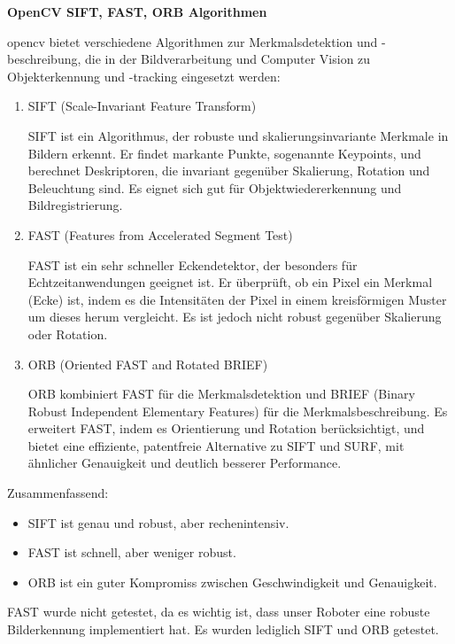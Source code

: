 \textbf{OpenCV SIFT, FAST, ORB Algorithmen}

\gls{opencv} bietet verschiedene Algorithmen zur Merkmalsdetektion und -beschreibung, die in der Bildverarbeitung und Computer Vision zu Objekterkennung und -tracking eingesetzt werden:

\begin{enumerate}
    \item SIFT (Scale-Invariant Feature Transform)
    
    SIFT ist ein Algorithmus, der robuste und skalierungsinvariante Merkmale in Bildern erkennt. Er findet markante Punkte, sogenannte Keypoints, und berechnet Deskriptoren, die invariant gegenüber Skalierung, Rotation und Beleuchtung sind. Es eignet sich gut für Objektwiedererkennung und Bildregistrierung.

    \item FAST (Features from Accelerated Segment Test)
    
    FAST ist ein sehr schneller Eckendetektor, der besonders für Echtzeitanwendungen geeignet ist. Er überprüft, ob ein Pixel ein Merkmal (Ecke) ist, indem es die Intensitäten der Pixel in einem kreisförmigen Muster um dieses herum vergleicht. Es ist jedoch nicht robust gegenüber Skalierung oder Rotation.

    \item ORB (Oriented FAST and Rotated BRIEF)
    
    ORB kombiniert FAST für die Merkmalsdetektion und BRIEF (Binary Robust Independent Elementary Features) für die Merkmalsbeschreibung. Es erweitert FAST, indem es Orientierung und Rotation berücksichtigt, und bietet eine effiziente, patentfreie Alternative zu SIFT und SURF, mit ähnlicher Genauigkeit und deutlich besserer Performance.
\end{enumerate}

Zusammenfassend:

\begin{itemize}
    \item SIFT ist genau und robust, aber rechenintensiv.
    \item FAST ist schnell, aber weniger robust.
    \item ORB ist ein guter Kompromiss zwischen Geschwindigkeit und Genauigkeit.
\end{itemize}

FAST wurde nicht getestet, da es wichtig ist, dass unser Roboter eine robuste Bilderkennung implementiert hat. Es wurden lediglich SIFT und ORB getestet.

